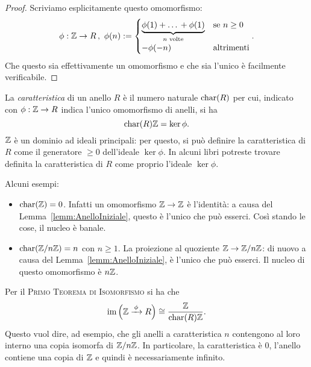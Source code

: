\begin{proof}
Scriviamo esplicitamente questo omomorfismo:
\[\phi : \Z \to R \,,\ \phi(n) := \begin{cases} \underbrace{\phi(1) + \dots{} + \phi(1)}_{n \text{ volte}} & \text{se } n \ge 0 \\ -\phi(-n) & \text{altrimenti} \end{cases}.\]
Che questo sia effettivamente un omomorfismo e che sia l'unico è facilmente verificabile.
\end{proof}

\begin{defi}
La {\em caratteristica} di un anello $R$ è il numero naturale $\mathrm{char}(R)$ per cui, indicato con $\phi : \mathbb{Z} \to R$ indica l'unico omomorfismo di anelli, si ha
\[\mathrm{char}(R)\mathbb{Z} = \ker \phi .\]
\(\mathbb{Z}\) è un dominio ad ideali principali: per questo, si può definire la caratteristica di $R$ come il generatore $\ge 0$ dell'ideale $\ker \phi$. In alcuni libri potreste trovare definita la caratteristica di $R$ come proprio l'ideale $\ker \phi$.
\end{defi} 

\begin{esem}
Alcuni esempi:
\begin{itemize}
\item $\mathrm{char}(\mathbb{Z}) = 0$. Infatti un omomorfismo $\mathbb{Z} \to \mathbb{Z}$ è l'identità: a causa del Lemma~\ref{lemm:AnelloIniziale}, questo è l'unico che può esserci. Così stando le cose, il nucleo è banale.
\item $\mathrm{char}(\mathbb{Z}/n\mathbb{Z})=n$ con $n \ge 1$. La proiezione al quoziente $\mathbb{Z} \to \mathbb{Z}/n\mathbb{Z}$: di nuovo a causa del Lemma~\ref{lemm:AnelloIniziale}, è l'unico che può esserci. Il nucleo di questo omomorfismo è $n\mathbb{Z}$.
\end{itemize}
\end{esem}

Per il {\scshape Primo Teorema di Isomorfismo} si ha che 
\[\operatorname{im}\left(\mathbb{Z} \xrightarrow{\,\phi\,} R\right) \cong \frac{\mathbb{Z}}{\mathrm{char}(R)\mathbb{Z}} .\]
Questo vuol dire, ad esempio, che gli anelli a caratteristica $n$ contengono al loro interno una copia isomorfa di $\mathbb{Z}/n\mathbb{Z}$. In particolare, la caratteristica è $0$, l'anello contiene una copia di $\mathbb{Z}$ e quindi è necessariamente infinito.


